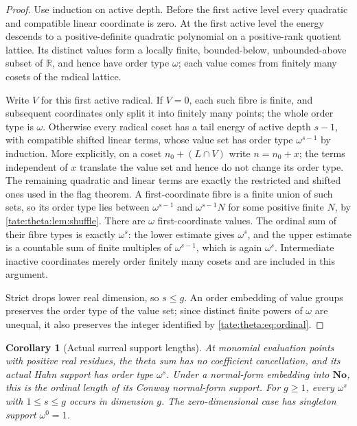\documentclass[11pt,letterpaper]{article}
\newtheorem{corollary}[corollary]{Corollary}
\theoremstyle{definition}
\newcommand{\R}{\mathbb R}
\newcommand{\No}{\mathbf{No}}
\begin{document}
\begin{proof}
Use induction on active depth. Before the first active level every
quadratic and compatible linear coordinate is zero. At the first active
level the energy descends to a positive-definite quadratic polynomial on a
positive-rank quotient lattice. Its distinct values form a locally finite,
bounded-below, unbounded-above subset of $\R$, and hence have order type
$\omega$; each value comes from finitely many cosets of the radical
lattice.

Write $V$ for this first active radical. If $V=0$, each such fibre is
finite, and subsequent coordinates only split it into finitely many points;
the whole order type
is $\omega$. Otherwise every radical coset has a tail energy of active
depth $s-1$, with compatible shifted linear terms, whose value set has order
type $\omega^{s-1}$ by induction. More explicitly, on a coset
$n_0+(L\cap V)$ write $n=n_0+x$; the terms independent of $x$ translate
the value set and hence do not change its order type. The remaining
quadratic and linear terms are exactly the restricted and shifted ones
used in the flag theorem. A first-coordinate fibre is a finite union
of such sets, so its order type lies between $\omega^{s-1}$ and
$\omega^{s-1}N$ for some positive finite $N$, by
\cref{tate:theta:lem:shuffle}. There are $\omega$ first-coordinate values.
The ordinal sum of their fibre types is exactly $\omega^s$: the lower
estimate gives $\omega^s$, and the upper estimate is a countable sum of
finite multiples of $\omega^{s-1}$, which is again $\omega^s$. Intermediate
inactive coordinates merely order finitely many cosets and are included in
this argument.

Strict drops lower real dimension, so $s\le g$. An order embedding of value
groups preserves the order type of the value set; since distinct finite
powers of $\omega$ are unequal, it also preserves the integer identified by
\eqref{tate:theta:eq:ordinal}.
\end{proof}

\begin{corollary}[Actual surreal support lengths]\label{tate:theta:cor:surrealordinal}
At monomial evaluation points with positive real residues, the theta sum
has no coefficient cancellation, and its actual Hahn support has order type
$\omega^s$. Under a normal-form embedding into $\No$, this is the ordinal
length of its Conway normal-form support. For $g\ge1$, every $\omega^s$
with $1\le s\le g$ occurs in dimension $g$. The zero-dimensional case has
singleton support $\omega^0=1$.
\end{corollary}
\end{document}
